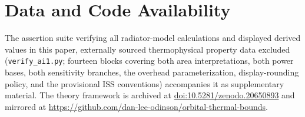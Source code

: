 \documentclass[11pt]{article}
\begin{document}
\section*{Data and Code Availability}

The assertion suite verifying all radiator-model calculations and displayed derived values in this paper, externally sourced thermophysical property data excluded (\texttt{verify\_ai1.py}; fourteen blocks covering both area interpretations, both power bases, both sensitivity branches, the overhead parameterization, display-rounding policy, and the provisional ISS conventions) accompanies it as supplementary material. The theory framework is archived at \href{https://doi.org/10.5281/zenodo.20650893}{doi:10.5281/zenodo.20650893} and mirrored at \url{https://github.com/dan-lee-odinson/orbital-thermal-bounds}.
\end{document}
